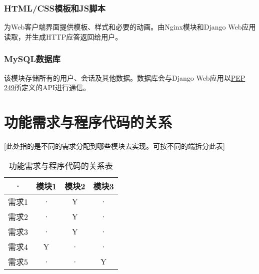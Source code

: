 \subsubsection{HTML/CSS模板和JS脚本}
为Web客户端界面提供模板、样式和必要的动画。由Nginx模块和Django Web应用读取，并生成HTTP应答返回给用户。

\subsubsection{MySQL数据库}
该模块存储所有的用户、会话及其他数据。数据库会与Django Web应用以\href{https://www.python.org/dev/peps/pep-0249}{PEP 249}所定义的API进行通信。






\section{功能需求与程序代码的关系}
[此处指的是不同的需求分配到哪些模块去实现。可按不同的端拆分此表]
\begin{table}[htbp]
\centering
\caption{功能需求与程序代码的关系表} \label{tab:requirement-module}
\begin{tabular}{|c|c|c|c|}
    \hline
    · & 模块1 & 模块2 & 模块3 \\
    \hline
    需求1 & · & Y & · \\
    \hline
    需求2 & · & Y & · \\
    \hline
    需求3 & · & Y & · \\
    \hline
    需求4 & Y & · & · \\
    \hline
    需求5 & · & · & Y \\
    \hline
\end{tabular}
\end{table}
